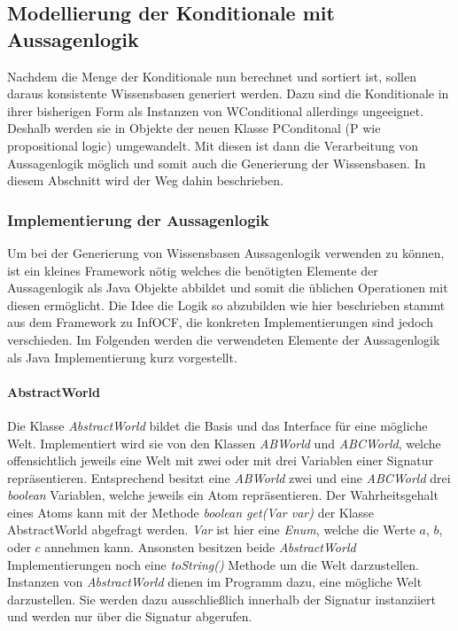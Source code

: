 \documentclass[12pt,a4paper]{article}
\begin{document}
\subsection{Modellierung der Konditionale mit Aussagenlogik}
Nachdem die Menge der Konditionale nun berechnet und sortiert ist, sollen daraus konsistente Wissensbasen generiert werden. Dazu sind die Konditionale in ihrer bisherigen Form als Instanzen von WConditional allerdings ungeeignet. Deshalb werden sie in Objekte der neuen Klasse PConditonal (P wie propositional logic) umgewandelt. Mit diesen ist dann die Verarbeitung von Aussagenlogik möglich und somit auch die Generierung der Wissensbasen. In diesem Abschnitt wird der Weg dahin beschrieben.




\subsubsection{Implementierung der Aussagenlogik}
\label{sec:logic}

Um bei der Generierung von Wissensbasen Aussagenlogik verwenden zu können, ist ein kleines Framework nötig welches die benötigten Elemente der Aussagenlogik als Java Objekte abbildet und somit die üblichen Operationen mit diesen ermöglicht. Die Idee die Logik so abzubilden wie hier  beschrieben stammt aus dem Framework zu InfOCF, die konkreten Implementierungen sind jedoch verschieden. Im Folgenden werden die verwendeten Elemente der Aussagenlogik als Java Implementierung kurz vorgestellt.



\paragraph{AbstractWorld} \mbox{}

Die Klasse \textit{AbstractWorld} bildet die Basis und das Interface für eine mögliche Welt. Implementiert wird sie von den Klassen \textit{ABWorld} und \textit{ABCWorld}, welche offensichtlich jeweils eine Welt mit zwei oder mit drei Variablen einer Signatur repräsentieren. Entsprechend besitzt eine \textit{ABWorld} zwei und eine \textit{ABCWorld} drei \textit{boolean} Variablen, welche jeweils ein Atom repräsentieren. Der Wahrheitsgehalt eines Atoms kann mit der Methode \textit{boolean get(Var var)} der Klasse AbstractWorld abgefragt werden. \textit{Var} ist hier eine \textit{Enum}, welche die Werte $a$, $b$, oder $c$ annehmen kann. Ansonsten besitzen beide \textit{AbstractWorld} Implementierungen noch eine \textit{toString()} Methode um die Welt darzustellen. \\
Instanzen von \textit{AbstractWorld} dienen im Programm dazu, eine mögliche Welt darzustellen. Sie werden dazu  ausschließlich innerhalb der Signatur instanziiert und werden nur über die Signatur abgerufen.
\end{document}
